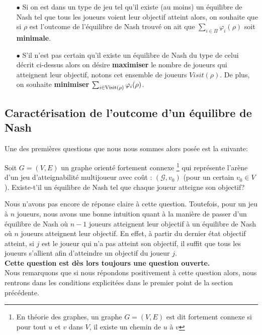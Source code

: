 \begin{itemize}
	\item[$\bullet$] Si on est dans un type de jeu tel qu'il existe (au moins) un équilibre de Nash tel que tous les joueurs voient leur objectif atteint alors, on souhaite que si $\rho$ est l'outcome de l'équilibre de Nash trouvé on ait que
	$ \sum_{i \in \Pi} \varphi_i(\rho)$ soit \textbf{minimale}.
	\item[$\bullet$]S'il n'est pas certain qu'il existe un équilibre de Nash du type de celui décrit ci-dessus alors on désire \textbf{maximiser} le nombre de joueurs qui atteignent leur objectif, notons cet ensemble de joueurs $Visit(\rho)$. De plus, on souhaite \textbf{minimiser} $\sum_{i \in \operatorname*{Visit}(\rho)} \varphi_i(\rho)$.
\end{itemize}

\subsection{Caractérisation de l'outcome d'un équilibre de Nash}

Une des premières questions que nous nous sommes alors posée est la suivante:
\begin{qst}
	\label{qst:1}
	
	Soit $G = (V,E)$ un graphe orienté fortement connexe \footnote{En théorie des graphes, un graphe $G = (V,E)$ est dit fortement connexe si pour tout $u$ et $v$ dans $V$, il existe un chemin de $u$ à $v$} qui représente l'arène d'un jeu d'atteignabilité multijoueur avec coût : $(\mathcal{G},v_{0})$ (pour un certain $v_{0} \in V$).
Existe-t'il un équilibre de Nash tel que chaque joueur atteigne son objectif?

\end{qst}

Nous n'avons pas encore de réponse claire à cette question. Toutefois, pour un jeu à $n$ joueurs, nous avons une bonne intuition quant à la manière de passer d'un équilibre de Nash où $n-1$ joueurs atteignent leur objectif à un équilibre de Nash où $n$ joueurs atteignent leur objectif. En effet, à partir du dernier état objectif atteint, si $j$ est le joueur qui n'a pas atteint son objectif, il suffit que tous les joueurs s'allient afin d'atteindre un objectif du joueur $j$.\\\textbf{Cette question est dès lors toujours une question ouverte.}
\\

Nous remarquons que si nous répondons positivement à cette question alors, nous rentrons dans les conditions explicitées dans le premier point de la section précédente.


